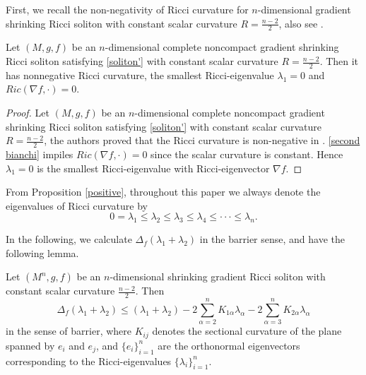 \documentclass[12pt]{amsart}
\begin{document}
	First, we recall the non-negativity of Ricci curvature for $n$-dimensional gradient shrinking Ricci soliton with constant scalar curvature $R=\frac{n-2}{2}$, also see \cite{FR16}.
	\begin{prop}[\cite{FR16}] \label{positive}
		Let $(M, g, f)$ be an $n$-dimensional complete noncompact gradient shrinking Ricci soliton satisfying \eqref{soliton'} with constant scalar curvature $R=\frac{n-2}{2}$. Then it has nonnegative Ricci curvature, the smallest Ricci-eigenvalue $\lambda_1=0$ and $Ric(\nabla f,\cdot)=0$.
	\end{prop}
	\begin{proof}
		Let $(M, g, f)$ be an $n$-dimensional complete noncompact gradient shrinking Ricci soliton satisfying \eqref{soliton'} with constant scalar curvature $R=\frac{n-2}{2}$, the authors proved that  the Ricci curvature is non-negative in \cite{FR16}.
		\smallskip
		\eqref{second bianchi} impiles $Ric(\nabla f,\cdot)=0$ since the scalar curvature is constant.
		Hence $\lambda_1=0$ is the smallest Ricci-eigenvalue with Ricci-eigenvector $\nabla f$.
		
	\end{proof}
	
	From Proposition \ref{positive}, throughout this paper we always denote the eigenvalues of Ricci curvature by
	\[
	0=\lambda_1\leq \lambda_2\leq  \lambda_3 \leq  \lambda_4\leq\cdot\cdot\cdot \leq \lambda_n.
	\]
	
	\smallskip
	In the following, we calculate $\Delta_f(\lambda_1+\lambda_2)$ in the barrier sense, and have the following lemma.
	\begin{lem} Let $(M^n, g, f)$ be an $n$-dimensional shrinking gradient Ricci soliton with constant scalar curvature $\frac{n-2}{2}$.  	
		Then
		\begin{equation}\label{l12}
		\Delta_f(\lambda_1+\lambda_2)\leq(\lambda_1+\lambda_2)-2\sum_{\alpha=2}^n K_{1\alpha}\lambda_\alpha-2\sum_{\alpha=3}^n K_{2\alpha}\lambda_\alpha
		\end{equation}	
		in the sense of barrier, where $K_{ij}$ denotes the sectional curvature of the plane spanned by $e_i$ and $e_j$, and $\{e_i\}_{i=1}^n$ are the orthonormal eigenvectors corresponding to the Ricci-eigenvalues $ \{\lambda_i\}_{i=1}^n$.
	\end{lem}
	
\end{document}
